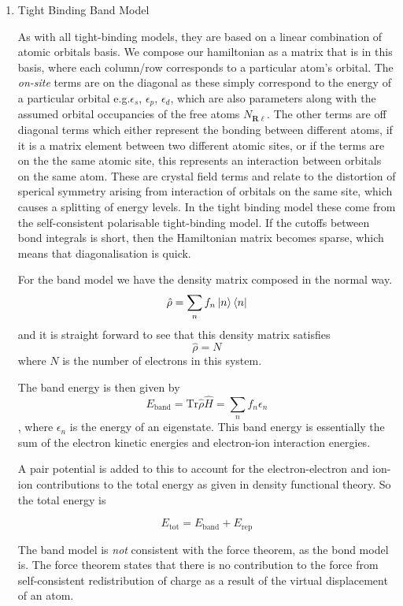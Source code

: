 \documentclass[11pt]{article}
\begin{document}
\begin{enumerate}
\item Tight Binding Band Model
\label{sec:orgfe072c9}

As with all tight-binding models, they are based on a linear combination of atomic orbitals basis. 
We compose our hamiltonian as a matrix that is in this basis, where each column/row corresponds to a particular
atom's orbital.
The \emph{on-site} terms are on the diagonal as these simply correspond to the energy of a particular orbital
e.g.\(\epsilon_s\), \(\epsilon_p\), \(\epsilon_d\), which are also parameters along with the assumed orbital occupancies 
of the free atoms \(N_{\mathbf{R}\ell}\).
The other terms are off diagonal terms which either represent the bonding between different atoms, if it is a matrix element
between two different atomic sites, or if the terms are on the the same atomic site, this represents an interaction
between orbitals on the same atom. These are crystal field terms and relate to the distortion of sperical symmetry arising from
interaction of orbitals on the same site, which causes a splitting of energy levels. 
In the tight binding model these come from the self-consistent polarisable tight-binding 
model. If the cutoffs between bond integrals is short, then the Hamiltonian matrix becomes sparse, 
which means that diagonalisation is quick. 

For the band model we have the density matrix composed in the normal way. 
$$ \hat{\rho} = \sum_{n} f_{n} \ket{n} \bra{n}$$ and it is straight forward to see that this density matrix satisfies 
$$ \hat{\rho} = N $$ where \(N\) is the number of electrons in this system. 

The band energy is then given by $$E_{\text{band}} = \text{Tr}\hat{\rho}\hat{H} = \sum_{n} f_{n}\epsilon_{n} $$, where \(\epsilon_{n}\)
is the energy of an eigenstate. This band energy is essentially the sum of the electron kinetic energies and electron-ion interaction energies. 

A pair potential is added to this to account for the electron-electron and ion-ion contributions to the total energy 
as given in density functional theory.
So the total energy is 

$$ E_{\text{tot}} =   E_{\text{band}} + E_{\text{rep}} $$


The band model is \emph{not} consistent with the force theorem, as the bond model is.
The force theorem states that there is no contribution to the force from self-consistent redistribution of charge 
as a result of the virtual displacement of an atom. 


\end{enumerate}
\end{document}
